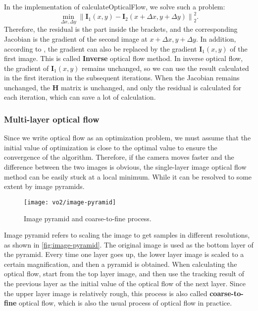 In the implementation of calculateOpticalFlow, we solve such a problem:
\begin{equation}
\mathop {\min }\limits_{\Delta x,\Delta y} \left\| {{\mathbf{I}_1}\left( {x,y} \right) - {\mathbf{I}_2}\left( {x + \Delta x,y + \Delta y} \right)} \right\|_2^2.
\end{equation}
Therefore, the residual is the part inside the brackets, and the corresponding Jacobian is the gradient of the second image at $x + \Delta x,y + \Delta y$. In addition, according to \cite{Baker2004}, the gradient can also be replaced by the gradient $\mathbf{I}_1 (x,y)$ of the first image. This is called \textbf{Inverse} optical flow method. In inverse optical flow, the gradient of $\mathbf{I}_1 (x,y)$ remains unchanged, so we can use the result calculated in the first iteration in the subsequent iterations. When the Jacobian remains unchanged, the $\mathbf{H}$ matrix is unchanged, and only the residual is calculated for each iteration, which can save a lot of calculation.

\subsubsection{Multi-layer optical flow}
Since we write optical flow as an optimization problem, we must assume that the initial value of optimization is close to the optimal value to ensure the convergence of the algorithm. Therefore, if the camera moves faster and the difference between the two images is obvious, the single-layer image optical flow method can be easily stuck at a local minimum. While it can be resolved to some extent by image pyramids.

\begin{figure}[!htp]
	\centering
	\texttt{[image: vo2/image-pyramid]}
	\caption{Image pyramid and coarse-to-fine process.}
	\label{fig:image-pyramid}
\end{figure}

Image pyramid refers to scaling the image to get samples in different resolutions, as shown in \autoref{fig:image-pyramid}. The original image is used as the bottom layer of the pyramid. Every time one layer goes up, the lower layer image is scaled to a certain magnification, and then a pyramid is obtained. When calculating the optical flow, start from the top layer image, and then use the tracking result of the previous layer as the initial value of the optical flow of the next layer. Since the upper layer image is relatively rough, this process is also called \textbf{coarse-to-fine} optical flow, which is also the usual process of optical flow in practice.

